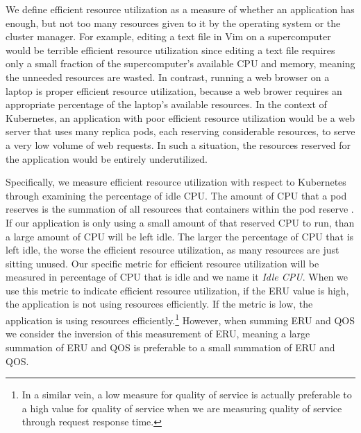We define efficient resource utilization as a measure of whether an application
has enough, but not too many resources given to it by the operating system or
the cluster manager. For example, editing a text file in Vim on a supercomputer
would be terrible efficient resource utilization since editing a text file
requires only a small fraction of the supercomputer's available CPU and memory,
meaning the unneeded resources are wasted. In contrast, running a web browser on
a laptop is proper efficient resource utilization, because a web brower requires
an appropriate percentage of the laptop's available resources.
In the context of Kubernetes, an application with
poor efficient resource utilization would be a web server
that uses many replica pods, each reserving considerable resources,
to serve a very low volume of web requests. In such a situation, the resources
reserved for the application would be entirely underutilized.

Specifically, we measure efficient resource utilization with respect to
Kubernetes through examining the percentage of idle CPU.
The amount of CPU that a pod reserves is the summation of
all resources that containers within the pod reserve
\cite{k8s-compute-resources}. If our application is only using a small amount of
that reserved CPU to run, than a large amount of CPU will be left idle. The
larger the percentage of CPU that is left idle, the worse the efficient resource
utilization, as many resources are just sitting unused.
Our specific metric for efficient resource
utilization will be measured in percentage of CPU that is idle and we name it
\textit{Idle CPU}. When we use this metric to indicate efficient resource utilization,
if the ERU value is high, the application is not using resources efficiently. If
the metric is low, the application is using resources efficiently.\footnote{In a
similar vein, a low measure for quality of service is actually preferable to a
high value for quality of service when we are measuring quality of service
through request response time.} However, when summing ERU and QOS we consider
the inversion of this measurement of ERU, meaning a large summation of ERU and
QOS is preferable to a small summation of ERU and QOS.


